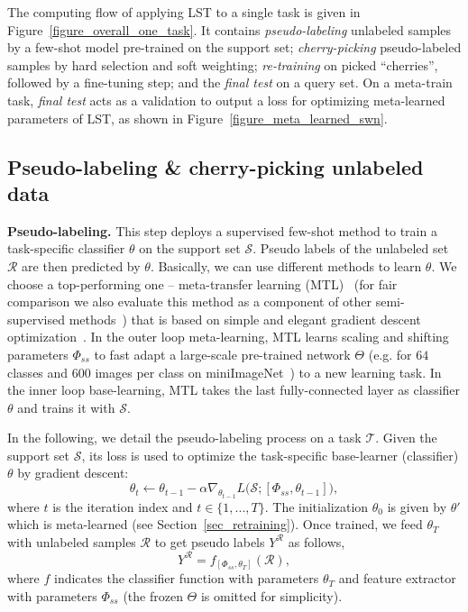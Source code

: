 \documentclass{article}
\newcommand{\myparagraph}[1]{\vspace{0.1em}\noindent\textbf{#1}}
\begin{document}
The computing flow of applying LST to a single task is given in Figure~\ref{figure_overall_one_task}.
It contains
\emph{pseudo-labeling} unlabeled samples by a few-shot model pre-trained on the support set; 
\emph{cherry-picking} pseudo-labeled samples by hard selection and soft weighting; \emph{re-training} on picked ``cherries'', followed by a fine-tuning step;
and the \emph{final test} on a query set.
On a meta-train task, \emph{final test} acts as a validation to output a loss for optimizing meta-learned parameters of LST, as shown in Figure~\ref{figure_meta_learned_swn}.


\subsection{Pseudo-labeling \& cherry-picking unlabeled data}
\label{sec_pseudolabeling}

\myparagraph{Pseudo-labeling.}
This step deploys a supervised few-shot method to train a task-specific classifier $\theta$ on the support set $\mathcal{S}$. 
Pseudo labels of the unlabeled set $\mathcal{R}$ are then predicted by $\theta$.
Basically, we can use different methods to learn $\theta$.
We choose a top-performing one -- meta-transfer learning (MTL)~\cite{SunCVPR2019} (for fair comparison we also evaluate this method as a component of other semi-supervised methods~\cite{RenICLR2018_semisupervised, LiuICLR2019transductive})
that is based on simple and elegant gradient descent optimization~\cite{FinnAL17}.
In the outer loop meta-learning, MTL learns scaling and shifting parameters $\Phi_{ss}$ to fast adapt a large-scale pre-trained network $\Theta$ (e.g. for $64$ classes and $600$ images per class on miniImageNet~\cite{VinyalsBLKW16}) to a new learning task.
In the inner loop base-learning, MTL takes the last fully-connected layer as classifier $\theta$ and trains it with $\mathcal{S}$. 



In the following, we detail the pseudo-labeling process on a task $\mathcal{T}$. 
Given the support set $\mathcal{S}$,
its loss is used to optimize the task-specific base-learner (classifier) $\theta$ by gradient descent:
\begin{equation}
\label{eq_base_classifier}
  \theta_t \gets \theta_{t-1} - \alpha\nabla_{\theta_{t-1}}L\big(\mathcal{S}; [\Phi_{ss}, \theta_{t-1}]\big),
\end{equation}
where $t$ is the iteration index and $t \in \{1, ..., T\}$. The initialization $\theta_0$ is given by $\theta'$ which is meta-learned (see Section~\ref{sec_retraining}). 
Once trained, we feed $\theta_T$ with unlabeled samples $\mathcal{R}$
to get pseudo labels $Y^\mathcal{R}$ as follows,
\begin{equation} 
\label{prediction_scores}
Y^\mathcal{R} = f_{[\Phi_{ss}, \theta_T]}(\mathcal{R}),
\end{equation}
where $f$ indicates the classifier function with parameters $\theta_T$ and feature extractor with parameters $\Phi_{ss}$ (the frozen $\Theta$ is omitted for simplicity).
\end{document}
